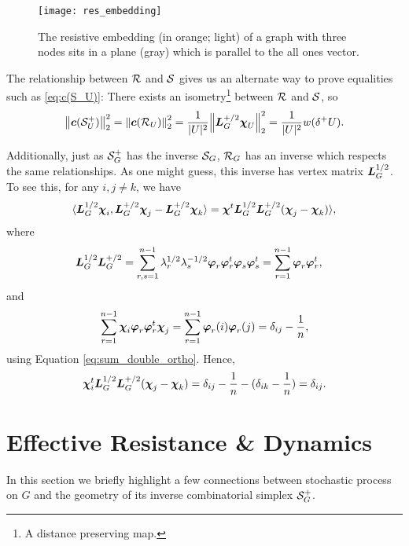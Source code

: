 \begin{figure}
	\centering
	\texttt{[image: res\_embedding]}
	\caption{The resistive embedding (in orange;  light) of a graph with three nodes sits in a plane (gray) which is parallel to the all ones vector. }
	\label{fig:res_embedding}
\end{figure}

The relationship between $\mathcal{R}$ and $\mathcal{S}$ gives us an alternate way to prove equalities such as \eqref{eq:c(S_U)}: There exists an isometry\footnote{A distance preserving map.} between $\mathcal{R}$ and $\mathcal{S}$, so 
\begin{equation*}
\norm{\vb*{c}(\mathcal{S}^+_U)}_2^2 = \norm{\vb*{c}(\mathcal{R}_U)}_2^2 = \frac{1}{|U|^2} \norm{\vb*{L}_G^{+/2}\boldsymbol{\chi}_U}_2^2 = \frac{1}{|U|^2}w(\delta^+ U).
\end{equation*}


Additionally, just as $\mathcal{S}_G^+$  has  the inverse $\mathcal{S}_G$, $\mathcal{R}_G$  has an inverse which respects the same  relationships. As one might guess, this inverse has vertex matrix $\vb*{L}_G^{1/2}$. To see this, for any $i,j\neq k$,  we have 
\begin{equation*}
\langle \vb*{L}_G^{1/2}\boldsymbol{\chi}_i,\vb*{L}_G^{+/2}\boldsymbol{\chi}_j-\vb*{L}_G^{+/2}\boldsymbol{\chi}_k\rangle = \boldsymbol{\chi}^t \vb*{L}_G^{1/2}\vb*{L}_G^{+/2}(\boldsymbol{\chi}_j-\boldsymbol{\chi}_k)\rangle,
\end{equation*}
where 
\begin{align*}
\vb*{L}_G^{1/2}\vb*{L}_G^{+/2} &= \sum_{r,s=1}^{n-1}\lambda_r^{1/2}\lambda_s^{-1/2}\vb*{\varphi}_r\vb*{\varphi}_r^t\vb*{\varphi}_s\vb*{\varphi}_s^t = \sum_{r=1}^{n-1} \vb*{\varphi}_r\vb*{\varphi}_r^t,
\end{align*}
and 
\begin{align*}
\sum_{r=1}^{n-1}\boldsymbol{\chi}_i \vb*{\varphi}_r\vb*{\varphi}_r^t\boldsymbol{\chi}_j = \sum_{r=1}^{n-1}\vb*{\varphi}_r(i)\vb*{\varphi}_r(j) = \delta_{ij} - \frac{1}{n},
\end{align*}
using Equation \eqref{eq:sum_double_ortho}. Hence, 
\begin{align*}
\boldsymbol{\chi}_i^t \vb*{L}_G^{1/2}\vb*{L}_G^{+/2}(\boldsymbol{\chi}_j-\boldsymbol{\chi}_k) = \delta_{ij} - \frac{1}{n} - (\delta_{ik}-\frac{1}{n}) = \delta_{ij}.
\end{align*}




\section{Effective  Resistance  \&  Dynamics}
\label{sec:dynamics}
In this section we briefly highlight a few connections between stochastic process on $G$ and  the geometry of its inverse combinatorial simplex $\mathcal{S}_G^+$. 

